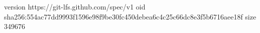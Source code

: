 version https://git-lfs.github.com/spec/v1
oid sha256:554ac77dd9993f1596e98f9be30fc450debea6c4c25c66dc8e3f5b6716aee18f
size 349676
